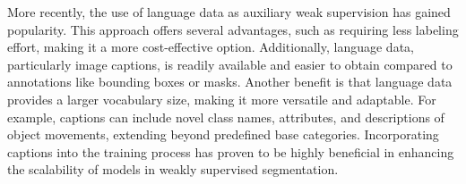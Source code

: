More recently, the use of language data as auxiliary weak supervision has gained popularity. This approach offers several advantages, such as requiring less labeling effort, making it a more cost-effective option. Additionally, language data, particularly image captions, is readily available and easier to obtain compared to annotations like bounding boxes or masks. Another benefit is that language data provides a larger vocabulary size, making it more versatile and adaptable. For example, captions can include novel class names, attributes, and descriptions of object movements, extending beyond predefined base categories. Incorporating captions into the training process has proven to be highly beneficial in enhancing the scalability of models in weakly supervised segmentation.

